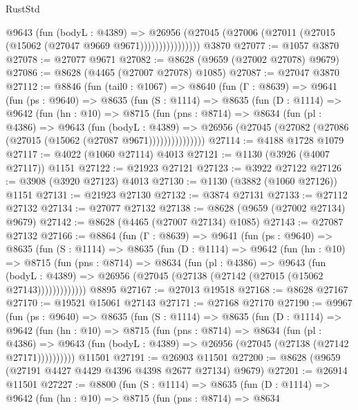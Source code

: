 \begin{lexlean}{RustStd}
\begin{coremodule}
                    @9643
                      (fun (bodyL : @4389) =>
                      @26956
                        (@27045 (@27006 (@27011 (@27015 (@15062 (@27047 @9669 @9671))))))))))))))))
    @3870
@27077 := @1057 @3870
@27078 := @27077 @9671
@27082 := @8628 (@9659 (@27002 @27078) @9679)
@27086 := @8628 (@4465 (@27007 @27078) @1085)
@27087 := @27047 @3870
@27112 := @8846
    (fun (tail0 : @1067) =>
    @8640
      (fun (Γ : @8639) =>
      @9641
        (fun (ps : @9640) =>
        @8635
          (fun (S : @1114) =>
          @8635
            (fun (D : @1114) =>
            @9642
              (fun (hn : @10) =>
              @8715
                (fun (pns : @8714) =>
                @8634
                  (fun (pl : @4386) =>
                  @9643
                    (fun (bodyL : @4389) =>
                    @26956 (@27045 (@27082 (@27086 (@27015 (@15062 (@27087 @9671)))))))))))))))
@27114 := @4188 @1728 @1079
@27117 := @4022 (@1060 @27114) @4013
@27121 := @1130 (@3926 (@4007 @27117)) @1151
@27122 := @21923 @27121
@27123 := @3922 @27122
@27126 := @3908 (@3920 @27123) @4013
@27130 := @1130 (@3882 (@1060 @27126)) @1151
@27131 := @21923 @27130
@27132 := @3874 @27131
@27133 := @27112 @27132
@27134 := @27077 @27132
@27138 := @8628 (@9659 (@27002 @27134) @9679)
@27142 := @8628 (@4465 (@27007 @27134) @1085)
@27143 := @27087 @27132
@27166 := @8864
    (fun (Γ : @8639) =>
    @9641
      (fun (ps : @9640) =>
      @8635
        (fun (S : @1114) =>
        @8635
          (fun (D : @1114) =>
          @9642
            (fun (hn : @10) =>
            @8715
              (fun (pns : @8714) =>
              @8634
                (fun (pl : @4386) =>
                @9643
                  (fun (bodyL : @4389) =>
                  @26956 (@27045 (@27138 (@27142 (@27015 (@15062 @27143)))))))))))))
    @8895
@27167 := @27013 @19518
@27168 := @8628 @27167
@27170 := @19521 @15061 @27143
@27171 := @27168 @27170
@27190 := @9967
    (fun (ps : @9640) =>
    @8635
      (fun (S : @1114) =>
      @8635
        (fun (D : @1114) =>
        @9642
          (fun (hn : @10) =>
          @8715
            (fun (pns : @8714) =>
            @8634
              (fun (pl : @4386) =>
              @9643 (fun (bodyL : @4389) => @26956 (@27045 (@27138 (@27142 @27171))))))))))
    @11501
@27191 := @26903 @11501
@27200 := @8628 (@9659 (@27191 @4427 @4429 @4396 @4398 @2677 @27134) @9679)
@27201 := @26914 @11501
@27227 := @8800
    (fun (S : @1114) =>
    @8635
      (fun (D : @1114) =>
      @9642
        (fun (hn : @10) =>
        @8715
          (fun (pns : @8714) =>
          @8634

\end{coremodule}
\end{lexlean}
